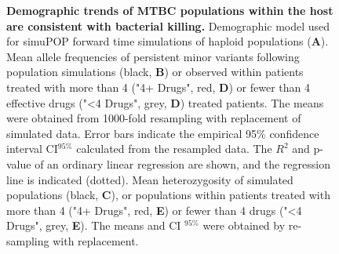 \documentclass[12pt, oneside]{article}   	%
\begin{document}
\begin{figure}
\centering
{}
\label{fig:supfig5}
\caption{\textbf{Demographic trends of MTBC populations within the host are consistent with bacterial killing.} Demographic model used for simuPOP \cite{simuPOP} forward time simulations of haploid populations (\textbf{A}). Mean allele frequencies of persistent minor variants following population simulations (black, \textbf{B}) or observed within patients treated with more than 4 ("4+ Drugs", red, \textbf{D}) or fewer than 4 effective drugs ("<4 Drugs", grey, \textbf{D}) treated patients. The means were obtained from 1000-fold resampling with replacement of simulated data. Error bars indicate the empirical 95\% confidence interval CI$^{95\%}$ calculated from the resampled data. The $R^2$ and p-value of an ordinary linear regression are shown, and the regression line is indicated (dotted).  Mean heterozygosity \cite{Cuevas2015} of simulated populations (black, \textbf{C}), or populations within patients treated with more than 4 ("4+ Drugs", red, \textbf{E}) or fewer than 4 drugs ("<4 Drugs", grey, \textbf{E}). The means and CI $^{95\%}$ were obtained by re-sampling with replacement.}
\end{figure}

\end{document}
